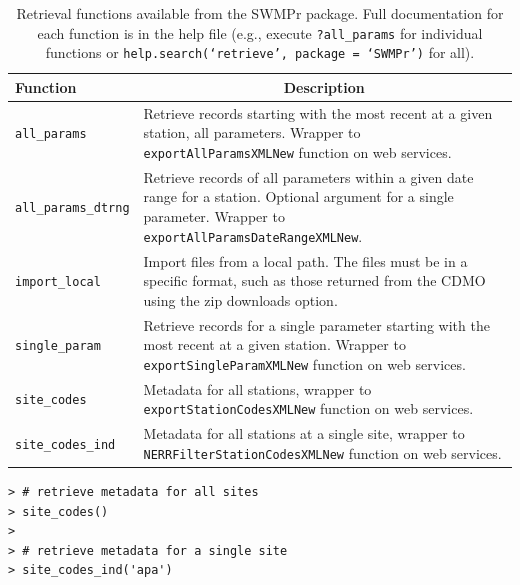 \documentclass[10pt,letterpaper]{article}\usepackage[]{graphicx}\usepackage[]{color}
\makeatletter
\newenvironment{kframe}{%
 \def\at@end@of@kframe{}%
 \ifinner\ifhmode%
  \def\at@end@of@kframe{\end{minipage}}%
  \begin{minipage}{\columnwidth}%
 \fi\fi%
 \def\FrameCommand##1{\hskip\@totalleftmargin \hskip-\fboxsep
 \colorbox{shadecolor}{##1}\hskip-\fboxsep
     \hskip-\linewidth \hskip-\@totalleftmargin \hskip\columnwidth}%
 \MakeFramed {\advance\hsize-\width
   \@totalleftmargin\z@ \linewidth\hsize
   \@setminipage}}%
 {\par\unskip\endMakeFramed%
 \at@end@of@kframe}
\newenvironment{knitrout}{}{} %
\makeatother
\begin{document}
\begin{table}[!tbp]
\caption{Retrieval functions available from the SWMPr package. Full documentation for each function is in the help file (e.g., execute \texttt{?all\_params} for individual functions or \texttt{help.search(`retrieve', package = `SWMPr')} for all).\label{tab:retrieve}} 
\begin{center}
\begin{tabular}{lp{3.5in}}
\hline\hline
\multicolumn{1}{l}{Function}&\multicolumn{1}{c}{Description}\tabularnewline
\hline
\texttt{all\_params}&Retrieve records starting with the most recent at a given station, all parameters.  Wrapper to \texttt{exportAllParamsXMLNew} function on web services.\tabularnewline
\texttt{all\_params\_dtrng}&Retrieve records of all parameters within a given date range for a station.  Optional argument for a single parameter. Wrapper to \texttt{exportAllParamsDateRangeXMLNew}.\tabularnewline
\texttt{import\_local}&Import files from a local path.  The files must be in a specific format, such as those returned from the \ac{CDMO} using the zip downloads option.\tabularnewline
\texttt{single\_param}&Retrieve records for a single parameter starting with the most recent at a given station.  Wrapper to \texttt{exportSingleParamXMLNew} function on web services.\tabularnewline
\texttt{site\_codes}&Metadata for all stations, wrapper to \texttt{exportStationCodesXMLNew} function on web services.\tabularnewline
\texttt{site\_codes\_ind}&Metadata for all stations at a single site, wrapper  to \texttt{NERRFilterStationCodesXMLNew} function on web services.\tabularnewline
\hline
\end{tabular}\end{center}

\end{table}


\begin{knitrout}\small
{}\color{fgcolor}\begin{kframe}
\begin{verbatim}
> # retrieve metadata for all sites
> site_codes()
> 
> # retrieve metadata for a single site
> site_codes_ind('apa')
\end{verbatim}
\end{kframe}
\end{knitrout}
\end{document}
